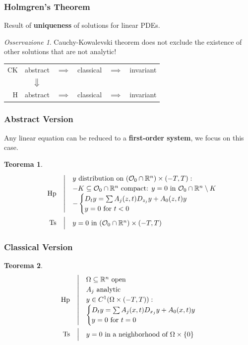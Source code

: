 \documentclass[serif,notheorems]{beamer}
\makeatletter
\newenvironment{ipotesi}%
{\quad\left|\quad\def\arraystretch{1.2}\begin{array}{@{}l@{}}}%
{\end{array}\right.}
\newcommand{\hpth}[2]
{
\begin{align*}
\quad
\text{Hp}
&\begin{ipotesi}
#1
\end{ipotesi}\\
\text{Ts}
&\begin{ipotesi}
#2
\end{ipotesi}
\end{align*}
}
\theoremstyle{definition} %
\newtheorem{theorem}{Teorema}[section] %
\theoremstyle{remark}
\newtheorem*{remark}{Osservazione}
\makeatother
\begin{document}
\begin{frame}
\frametitle{Holmgren's Theorem}
Result of \textbf{uniqueness} of solutions for linear PDEs.
\begin{remark}
Cauchy-Kowalevski theorem does not exclude the existence of other solutions that are not analytic!
\end{remark}
\end{frame}

\begin{frame}
\begin{table}
\renewcommand{\arraystretch}{1.5}
\begin{tabular}{r||ccccc} 
CK & abstract & $\implies$  & classical & $\implies$ & invariant\\
&$\big\Downarrow$ &&&&\\
H & abstract & $\implies$ & classical & $\implies$ & invariant\\
\end{tabular}
\end{table}
\end{frame}

\begin{frame}
\frametitle{Abstract Version}
Any linear equation can be reduced to a \textbf{first-order system}, we focus on this case. 
\begin{theorem}
\hpth{
y \text{ distribution on } (\mathcal{O}_0 \cap \mathbb{R}^n) \times (-T,T):\\
- K\subseteq  \mathcal{O}_0 \cap \mathbb{R}^n \text{ compact: } y=0  \text{ in } \mathcal{O}_0 \cap \mathbb{R}^n \setminus K\\
- \begin{cases}
D_t y = \sum A_j (z,t) D_{z_j}y+A_0(z,t)y \\
y=0 \text{ for } t<0
\end{cases}\\
}{
y = 0 \text{ in } (\mathcal{O}_0 \cap \mathbb{R}^n) \times (-T,T) \\
}
\end{theorem}
\end{frame}

\begin{frame}
\frametitle{Classical Version}
\begin{theorem}
\hpth{
\Omega \subseteq \mathbb{R}^n \text{ open}\\
A_j \text{ analytic}\\
y\in C^1 (\Omega \times (-T,T)): \\ 
\begin{cases}
D_t y = \sum A_j (x,t) D_{x_j}y+A_0(x,t)y \\
y=0 \text{ for } t=0
\end{cases} \\
}{
y = 0 \text{ in a neighborhood of } \Omega \times \{ 0\}
}
\end{theorem}
\end{frame}
\end{document}
